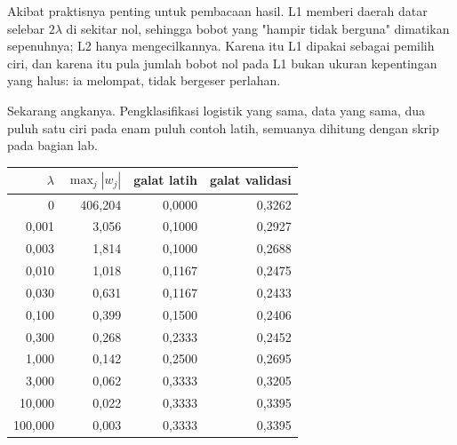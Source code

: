 Akibat praktisnya penting untuk pembacaan hasil. L1 memberi daerah datar selebar
$2\lambda$ di sekitar nol, sehingga bobot yang "hampir tidak berguna" dimatikan
sepenuhnya; L2 hanya mengecilkannya. Karena itu L1 dipakai sebagai pemilih ciri, dan
karena itu pula jumlah bobot nol pada L1 bukan ukuran kepentingan yang halus: ia
melompat, tidak bergeser perlahan.

Sekarang angkanya. Pengklasifikasi logistik yang sama, data yang sama, dua puluh satu
ciri pada enam puluh contoh latih, semuanya dihitung dengan skrip pada bagian lab.

\begin{center}
\small
\begin{tabular}{rrrr}
\hline
$\lambda$ & $\max_j|w_j|$ & galat latih & galat validasi \\
\hline
0       & 406,204 & 0,0000 & 0,3262 \\
0,001   &   3,056 & 0,1000 & 0,2927 \\
0,003   &   1,814 & 0,1000 & 0,2688 \\
0,010   &   1,018 & 0,1167 & 0,2475 \\
0,030   &   0,631 & 0,1167 & 0,2433 \\
0,100   &   0,399 & 0,1500 & 0,2406 \\
0,300   &   0,268 & 0,2333 & 0,2452 \\
1,000   &   0,142 & 0,2500 & 0,2695 \\
3,000   &   0,062 & 0,3333 & 0,3205 \\
10,000  &   0,022 & 0,3333 & 0,3395 \\
100,000 &   0,003 & 0,3333 & 0,3395 \\
\hline
\end{tabular}
\end{center}

